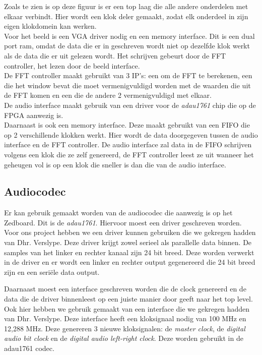\documentclass[a4paper,kul]{kulakarticle} %
\begin{document}
Zoals te zien is op deze figuur is er een top laag die alle andere onderdelen met elkaar verbindt. Hier wordt een klok deler gemaakt, zodat elk onderdeel in zijn eigen klokdomein kan werken. \\

Voor het beeld is een VGA driver nodig en een memory interface. Dit is een dual port ram, omdat de data die er in geschreven wordt niet op dezelfde klok werkt als de data die er uit gelezen wordt. Het schrijven gebeurt door de FFT controller, het lezen door de beeld interface. \\

De FFT controller maakt gebruikt van 3 IP's: een om de FFT te berekenen, een die het window bevat die moet vermenigvuldigd worden met de waarden die uit de FFT komen en een die de andere 2 vermenigvuldigd met elkaar. \\

De audio interface maakt gebruik van een driver voor de \textit{adau1761} chip die op de FPGA aanwezig is.\\

Daarnaast is ook een memory interface. Deze maakt gebruikt van een FIFO die op 2 verschillende klokken werkt. Hier wordt de data doorgegeven tussen de audio interface en de FFT controller. De audio interface zal data in de FIFO schrijven volgens een klok die ze zelf genereerd, de FFT controller leest ze uit wanneer het geheugen vol is op een klok die sneller is dan die van de audio interface.

\subsection{Audiocodec}

Er kan gebruik gemaakt worden van de audiocodec die aanwezig is op het Zedboard. Dit is de \textit{adau1761}. Hiervoor moest een driver geschreven worden. Voor ons project hebben we een driver kunnen gebruiken die we gekregen hadden van Dhr. Verslype. Deze driver krijgt zowel serieel als parallelle data binnen. De samples van het linker en rechter kanaal zijn 24 bit breed. Deze worden verwerkt in de driver en er wordt een linker en rechter output gegenereerd die 24 bit breed zijn en een seriële data output. \newline

Daarnaast moest een interface geschreven worden die de clock genereerd en de data die de driver binnenleest op een juiste manier door geeft naar het top level. Ook hier hebben we gebruik gemaakt van een interface die we gekregen hadden van Dhr. Verslype. Deze interface heeft een kloksignaal nodig van 100 MHz en 12,288 MHz. Deze genereren 3 nieuwe kloksignalen: de \textit{master clock}, de \textit{digital audio bit clock} en de \textit{digital audio left-right clock}. Deze worden gebruikt in de adau1761 codec. \newline
\end{document}

